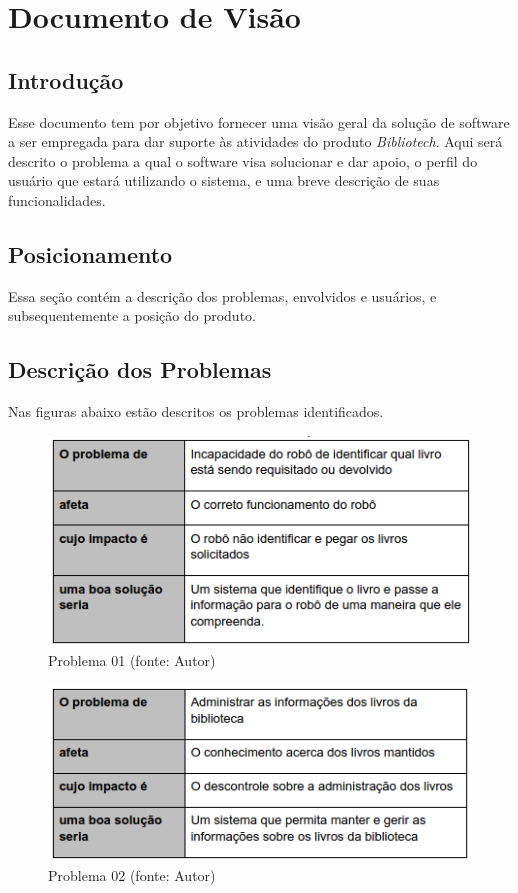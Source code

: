 \chapter[Documento de Visão]{Documento de Visão}
\section{Introdução}
Esse documento tem por objetivo fornecer uma visão geral da solução de software a ser empregada para dar suporte às atividades do produto \textit{Bibliotech}. Aqui será descrito o problema a qual o software visa solucionar e dar apoio, o perfil do usuário que estará utilizando o sistema, e uma breve descrição de suas funcionalidades.

\section{Posicionamento}
Essa seção contém a descrição dos problemas, envolvidos e usuários, e subsequentemente a posição do produto.


\section{Descrição dos Problemas}
Nas figuras abaixo estão descritos os problemas identificados.

\begin{figure}[!h]
\centering
\includegraphics[scale=0.65, angle = 360]{figuras/descricao_problema1}
\caption[]{Problema 01 (fonte: Autor)}
\end{figure}
\FloatBarrier

\begin{figure}[!h]
\centering
\includegraphics[scale=0.65, angle = 360]{figuras/descricao_problema2}
\caption[]{Problema 02 (fonte: Autor)}
\end{figure}
\FloatBarrier


